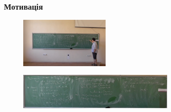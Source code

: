 \begin{frame}
    \frametitle{Мотивація}
    \begin{figure}
        \includegraphics[width=0.4\textwidth]{images/before.png}
    \end{figure}
    \begin{figure}
        \includegraphics[width=0.7\textwidth]{images/after.png}
    \end{figure}

\end{frame}
